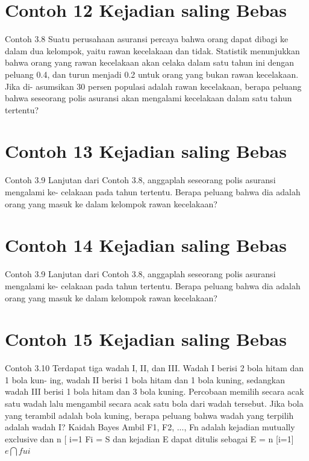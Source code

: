 \documentclass[11pt,fleqn]{book} %
\begin{document}
{{\vspace{0.5in}
\section{Contoh 12 Kejadian saling Bebas}
Contoh 3.8 Suatu perusahaan asuransi percaya bahwa orang dapat dibagi ke dalam dua kelompok, yaitu rawan kecelakaan dan tidak. Statistik menunjukkan bahwa orang yang rawan kecelakaan akan celaka dalam satu tahun ini dengan peluang 0.4, dan turun menjadi 0.2 untuk orang yang bukan rawan kecelakaan. Jika di- asumsikan 30 persen populasi adalah rawan kecelakaan, berapa peluang bahwa seseorang polis asuransi akan mengalami kecelakaan dalam satu tahun tertentu?

\vspace{0.5in}
\section{Contoh 13 Kejadian saling Bebas}
Contoh 3.9 Lanjutan dari Contoh 3.8, anggaplah seseorang polis asuransi mengalami ke- celakaan pada tahun tertentu. Berapa peluang bahwa dia adalah orang yang masuk ke dalam kelompok rawan kecelakaan?

\vspace{0.5in}
\section{Contoh 14 Kejadian saling Bebas}

Contoh 3.9 Lanjutan dari Contoh 3.8, anggaplah seseorang polis asuransi mengalami ke- celakaan pada tahun tertentu. Berapa peluang bahwa dia adalah orang yang masuk ke dalam kelompok rawan kecelakaan?

\vspace{0.5in}
\section{Contoh 15 Kejadian saling Bebas}
Contoh 3.10 Terdapat tiga wadah I, II, dan III. Wadah I berisi 2 bola hitam dan 1 bola kun- ing, wadah II berisi 1 bola hitam dan 1 bola kuning, sedangkan wadah III berisi 1 bola hitam dan 3 bola kuning. Percobaan memilih secara acak satu wadah lalu mengambil secara acak satu bola dari wadah tersebut. Jika bola yang terambil adalah bola kuning, berapa peluang bahwa wadah yang terpilih adalah wadah I?
Kaidah Bayes Ambil F1, F2, ..., Fn adalah kejadian mutually exclusive dan n [
i=1
Fi = S
dan kejadian E dapat ditulis sebagai
E = n [i=1] 
$ e\bigcap fui $

}}
\end{document}
